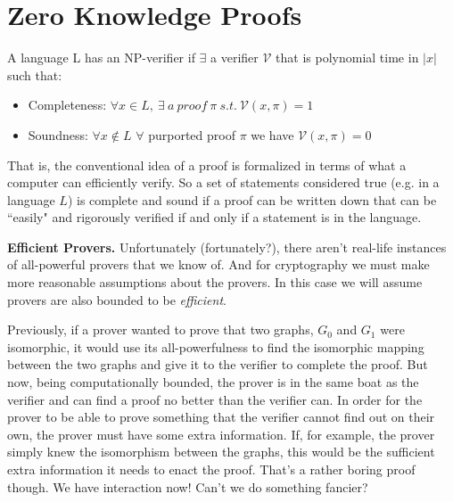 

\section{Zero Knowledge Proofs}


{ A language L has an NP-verifier if $\exists$ a verifier $\mathcal{V}$ that is polynomial time in $|x|$ such that:
		\begin{itemize}
			\item Completeness: $\forall x\in L,\ \exists\ a\ proof\ \pi\ s.t.\ \mathcal{V}(x,\pi)=1$
			\item Soundness: $\forall x \notin L$ $\forall$ purported proof $\pi$ we have $\mathcal{V}(x,\pi)=0$
		\end{itemize}}

		That is, the conventional idea of a proof is formalized in terms of what a computer can efficiently verify.  So a set of statements considered true (e.g. in a language $L$) is complete and sound if a proof can be written down that can be ``easily" and rigorously verified if and only if a statement is in the language.


\bigskip
\noindent\textbf{Efficient Provers.}
		Unfortunately (fortunately?), there aren't real-life instances of all-powerful provers that we know of.  And for cryptography we must make more reasonable assumptions about the provers.  In this case we will assume provers are also bounded to be \emph{efficient}.
		
		Previously, if a prover wanted to prove that two graphs, $G_0$ and $G_1$ were isomorphic, it would use its all-powerfulness to find the isomorphic mapping between the two graphs and give it to the verifier to complete the proof.  But now, being computationally bounded, the prover is in the same boat as the verifier and can find a proof no better than the verifier can.  In order for the prover to be able to prove something that the verifier cannot find out on their own, the prover must have some extra information.  If, for example, the prover simply knew the isomorphism between the graphs, this would be the sufficient extra information it needs to enact the proof.  That's a rather boring proof though.  We have interaction now!  Can't we do something fancier?
		
